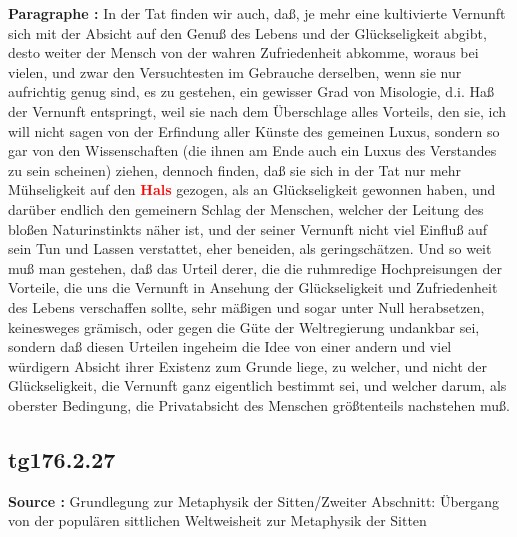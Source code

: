 \documentclass[a4paper,12pt,twoside]{book}
\newcommand{\match}[1]{\textcolor{red}{\textbf{#1}}}
\begin{document}
	\noindent\textbf{Paragraphe : }In der Tat finden wir auch, daß, je mehr eine kultivierte Vernunft sich mit der Absicht auf den Genuß des Lebens  und der Glückseligkeit abgibt, desto weiter der Mensch von der wahren Zufriedenheit abkomme, woraus bei vielen, und zwar den Versuchtesten im Gebrauche derselben, wenn sie nur aufrichtig genug sind, es zu gestehen, ein gewisser Grad von Misologie, d.i. Haß der Vernunft entspringt, weil sie nach dem Überschlage alles Vorteils, den sie, ich will nicht sagen von der Erfindung aller Künste des gemeinen Luxus, sondern so gar von den Wissenschaften (die ihnen am Ende auch ein Luxus des Verstandes zu sein scheinen) ziehen, dennoch finden, daß sie sich in der Tat nur mehr Mühseligkeit auf den \match{Hals} gezogen, als an Glückseligkeit gewonnen haben, und darüber endlich den gemeinern Schlag der Menschen, welcher der Leitung des bloßen Naturinstinkts näher ist, und der seiner Vernunft nicht viel Einfluß auf sein Tun und Lassen verstattet, eher beneiden, als geringschätzen. Und so weit muß man gestehen, daß das Urteil derer, die die ruhmredige Hochpreisungen der Vorteile, die uns die Vernunft in Ansehung der Glückseligkeit und Zufriedenheit des Lebens verschaffen sollte, sehr mäßigen und sogar unter Null herabsetzen, keinesweges grämisch, oder gegen die Güte der Weltregierung undankbar sei, sondern daß diesen Urteilen ingeheim die Idee von einer andern und viel würdigern Absicht ihrer Existenz zum Grunde liege, zu welcher, und nicht der Glückseligkeit, die Vernunft ganz eigentlich bestimmt sei, und welcher darum, als oberster Bedingung, die Privatabsicht des Menschen größtenteils nachstehen muß. 
	
	\subsection*{tg176.2.27} 
	\textbf{Source : }Grundlegung zur Metaphysik der Sitten/Zweiter Abschnitt: Übergang von der populären sittlichen Weltweisheit zur Metaphysik der Sitten\\  
	
\end{document}
